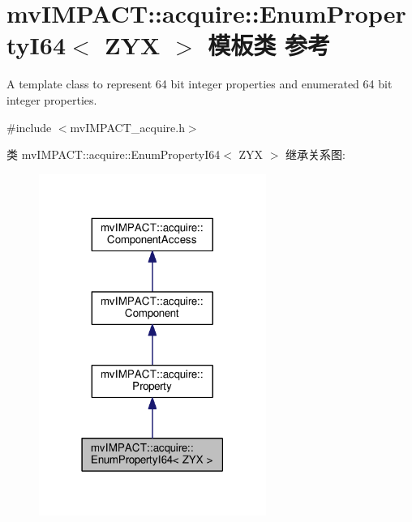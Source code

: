 \hypertarget{classmv_i_m_p_a_c_t_1_1acquire_1_1_enum_property_i64}{\section{mv\+I\+M\+P\+A\+C\+T\+:\+:acquire\+:\+:Enum\+Property\+I64$<$ Z\+Y\+X $>$ 模板类 参考}
\label{classmv_i_m_p_a_c_t_1_1acquire_1_1_enum_property_i64}
}


A template class to represent 64 bit integer properties and enumerated 64 bit integer properties.  




{\ttfamily \#include $<$mv\+I\+M\+P\+A\+C\+T\+\_\+acquire.\+h$>$}



类 mv\+I\+M\+P\+A\+C\+T\+:\+:acquire\+:\+:Enum\+Property\+I64$<$ Z\+Y\+X $>$ 继承关系图\+:
\nopagebreak
\begin{figure}[H]
\begin{center}
\leavevmode
\includegraphics[width=210pt]{classmv_i_m_p_a_c_t_1_1acquire_1_1_enum_property_i64__inherit__graph}
\end{center}
\end{figure}


